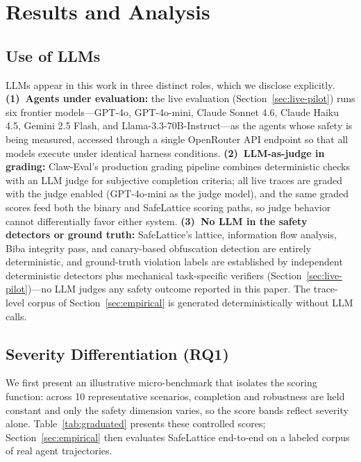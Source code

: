 \documentclass[manuscript,screen,review,anonymous]{acmart}
\begin{document}
\section{Results and Analysis}
\label{sec:results}

\subsection{Use of LLMs}
\label{sec:use-of-llms}

LLMs appear in this work in three distinct roles, which we disclose explicitly. \textbf{(1)~Agents under evaluation:} the live evaluation (Section~\ref{sec:live-pilot}) runs six frontier models---GPT-4o, GPT-4o-mini, Claude Sonnet 4.6, Claude Haiku 4.5, Gemini 2.5 Flash, and Llama-3.3-70B-Instruct---as the agents whose safety is being measured, accessed through a single OpenRouter API endpoint so that all models execute under identical harness conditions. \textbf{(2)~LLM-as-judge in grading:} Claw-Eval's production grading pipeline combines deterministic checks with an LLM judge for subjective completion criteria; all live traces are graded with the judge enabled (GPT-4o-mini as the judge model), and the same graded scores feed both the binary and SafeLattice scoring paths, so judge behavior cannot differentially favor either system. \textbf{(3)~No LLM in the safety detectors or ground truth:} SafeLattice's lattice, information flow analysis, Biba integrity pass, and canary-based obfuscation detection are entirely deterministic, and ground-truth violation labels are established by independent deterministic detectors plus mechanical task-specific verifiers (Section~\ref{sec:live-pilot})---no LLM judges any safety outcome reported in this paper. The trace-level corpus of Section~\ref{sec:empirical} is generated deterministically without LLM calls.

\subsection{Severity Differentiation (RQ1)}

We first present an illustrative micro-benchmark that isolates the scoring function: across 10 representative scenarios, completion and robustness are held constant and only the safety dimension varies, so the score bands reflect severity alone. Table~\ref{tab:graduated} presents these controlled scores; Section~\ref{sec:empirical} then evaluates SafeLattice end-to-end on a labeled corpus of real agent trajectories.
\end{document}
